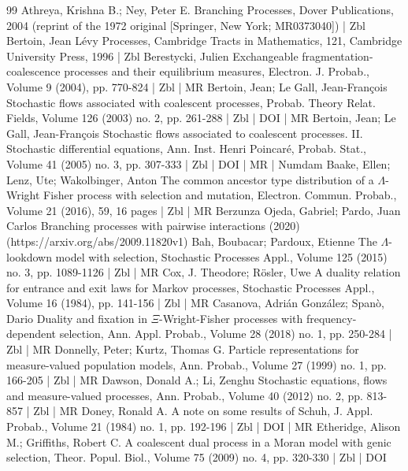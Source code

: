\documentclass[10pt]{amsart}
\theoremstyle{definition}\newtheorem{defi}[theo]{Definition}\newtheorem{rema}[theo]{Remark}\newtheorem{exam}[theo]{Example}\newtheorem{exem}[theo]{Example}\newtheorem{nota}[theo]{Notation}
\begin{document}
\begin{thebibliography}{99}
 Athreya, Krishna B.; Ney, Peter E. Branching Processes, Dover Publications, 2004 (reprint of the 1972 original [Springer, New York; MR0373040]) | Zbl
 Bertoin, Jean Lévy Processes, Cambridge Tracts in Mathematics, 121, Cambridge University Press, 1996 | Zbl
 Berestycki, Julien Exchangeable fragmentation-coalescence processes and their equilibrium measures, Electron. J. Probab., Volume 9 (2004), pp. 770-824 | Zbl | MR
 Bertoin, Jean; Le Gall, Jean-François Stochastic flows associated with coalescent processes, Probab. Theory Relat. Fields, Volume 126 (2003) no. 2, pp. 261-288 | Zbl | DOI | MR
 Bertoin, Jean; Le Gall, Jean-François Stochastic flows associated to coalescent processes. II. Stochastic differential equations, Ann. Inst. Henri Poincaré, Probab. Stat., Volume 41 (2005) no. 3, pp. 307-333 | Zbl | DOI | MR | Numdam
 Baake, Ellen; Lenz, Ute; Wakolbinger, Anton The common ancestor type distribution of a $\Lambda $-Wright Fisher process with selection and mutation, Electron. Commun. Probab., Volume 21 (2016), 59, 16 pages | Zbl | MR
 Berzunza Ojeda, Gabriel; Pardo, Juan Carlos Branching processes with pairwise interactions (2020) (https://arxiv.org/abs/2009.11820v1)
 Bah, Boubacar; Pardoux, Etienne The $\Lambda $-lookdown model with selection, Stochastic Processes Appl., Volume 125 (2015) no. 3, pp. 1089-1126 | Zbl | MR
 Cox, J. Theodore; Rösler, Uwe A duality relation for entrance and exit laws for Markov processes, Stochastic Processes Appl., Volume 16 (1984), pp. 141-156 | Zbl | MR
 Casanova, Adrián González; Spanò, Dario Duality and fixation in $\Xi $-Wright-Fisher processes with frequency-dependent selection, Ann. Appl. Probab., Volume 28 (2018) no. 1, pp. 250-284 | Zbl | MR
 Donnelly, Peter; Kurtz, Thomas G. Particle representations for measure-valued population models, Ann. Probab., Volume 27 (1999) no. 1, pp. 166-205 | Zbl | MR
 Dawson, Donald A.; Li, Zenghu Stochastic equations, flows and measure-valued processes, Ann. Probab., Volume 40 (2012) no. 2, pp. 813-857 | Zbl | MR
 Doney, Ronald A. A note on some results of Schuh, J. Appl. Probab., Volume 21 (1984) no. 1, pp. 192-196 | Zbl | DOI | MR
 Etheridge, Alison M.; Griffiths, Robert C. A coalescent dual process in a Moran model with genic selection, Theor. Popul. Biol., Volume 75 (2009) no. 4, pp. 320-330 | Zbl | DOI

\end{thebibliography}
\end{document}
